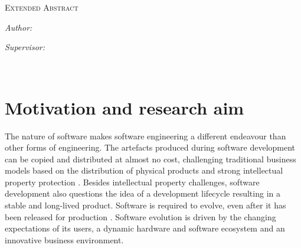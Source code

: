 \begin{center}

{\scshape \univname\par}\vspace{1.5cm} %
\textsc{\Large Extended Abstract}\\[0.5cm] %

{\bfseries \ttitle\par}\vspace{0.4cm} %

\bigskip

\begin{minipage}[t]{0.4\textwidth}
\begin{flushleft} \large
\emph{Author:}\\
{\authorname} %
\end{flushleft}
\end{minipage}
\begin{minipage}[t]{0.4\textwidth}
\begin{flushright} \large
\emph{Supervisor:} \\
{\supname} %
\end{flushright}
\end{minipage}\\[3cm]
 
\end{center}


\section*{Motivation and research aim}
The nature of software makes software engineering a different endeavour than other forms of engineering. The artefacts produced during software development can be copied and distributed at almost no cost, challenging traditional business models based on the distribution of physical products and strong intellectual property protection \citep{Kogut2001a}. Besides intellectual property challenges, software development also questions the idea of a development lifecycle resulting in a stable and long-lived product. Software is required to evolve, even after it has been released for production \citep{Lehman1980a}. Software evolution is driven by the changing expectations of its users, a dynamic hardware and software ecosystem and an innovative business environment.

